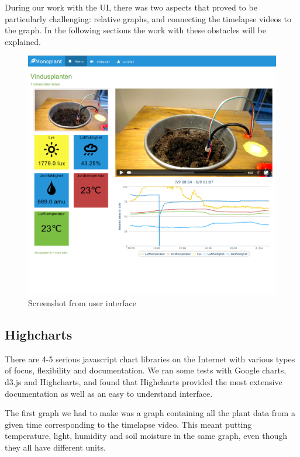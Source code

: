 During our work with the UI, there was two aspects that proved to be particularly challenging: relative graphs, and connecting the timelapse videos to the graph. In the following sections the work with these obstacles will be explained. 

\begin{figure}
\centering
\includegraphics[width=1\textwidth]{img/interface/mainpage.png}
\caption{Screenshot from user interface}
\label{fig:mainpage}
\end{figure}

\subsection{Highcharts}
There are 4-5 serious javascript chart libraries on the Internet with various types of focus, flexibility and documentation. We ran some tests with Google charts, d3.js and Highcharts, and found that Highcharts provided the most extensive documentation as well as an easy to understand interface. 

The first graph we had to make was a graph containing all the plant data from a given time corresponding to the timelapse video. This meant putting temperature, light, humidity and soil moisture in the same graph, even though they all have different units. 



